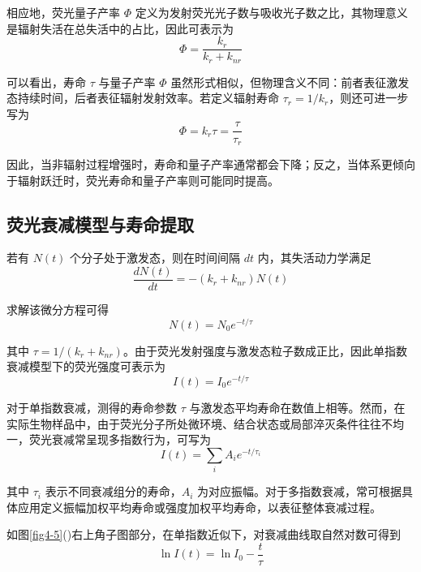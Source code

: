 相应地，荧光量子产率 $\Phi$ 定义为发射荧光光子数与吸收光子数之比，其物理意义是辐射失活在总失活中的占比，因此可表示为
\begin{equation}
  \Phi=\frac{k_r}{k_r+k_{nr}}
\end{equation}

可以看出，寿命 $\tau$ 与量子产率 $\Phi$ 虽然形式相似，但物理含义不同：前者表征激发态持续时间，后者表征辐射发射效率。若定义辐射寿命 $\tau_r=1/k_r$，则还可进一步写为
\begin{equation}
  \Phi = k_r\tau=\frac{\tau}{\tau_r}
\end{equation}

因此，当非辐射过程增强时，寿命和量子产率通常都会下降；反之，当体系更倾向于辐射跃迁时，荧光寿命和量子产率则可能同时提高。



\subsection{荧光衰减模型与寿命提取}\label{5.1.2}

若有 $N(t)$ 个分子处于激发态，则在时间间隔 $dt$ 内，其失活动力学满足
\begin{equation}
  \frac{dN(t)}{dt}=-(k_r+k_{nr})N(t)
\end{equation}

求解该微分方程可得
\begin{equation}
  N(t)=N_0 e^{-t/\tau}
\end{equation}

其中 $\tau=1/(k_r+k_{nr})$。由于荧光发射强度与激发态粒子数成正比，因此单指数衰减模型下的荧光强度可表示为
\begin{equation}
  I(t)=I_0 e^{-t/\tau}
\end{equation}

对于单指数衰减，测得的寿命参数 $\tau$ 与激发态平均寿命在数值上相等。然而，在实际生物样品中，由于荧光分子所处微环境、结合状态或局部淬灭条件往往不均一，荧光衰减常呈现多指数行为，可写为
\begin{equation}
  I(t)=\sum_i A_i e^{-t/\tau_i}
\end{equation}

其中 $\tau_i$ 表示不同衰减组分的寿命，$A_i$ 为对应振幅。对于多指数衰减，常可根据具体应用定义振幅加权平均寿命或强度加权平均寿命，以表征整体衰减过程。

如图\ref{fig4-5}()右上角子图部分，在单指数近似下，对衰减曲线取自然对数可得到
\begin{equation}
  \ln I(t)=\ln I_0-\frac{t}{\tau}
\end{equation}

